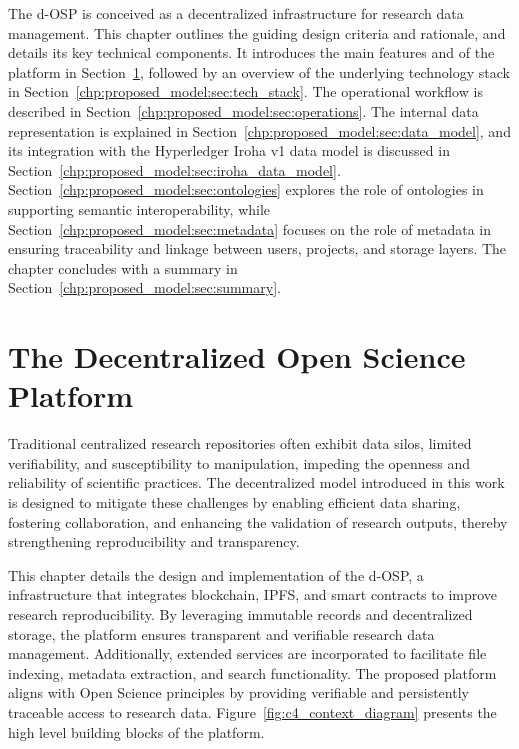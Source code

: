 \documentclass[final]{rc-book-2.14}
\begin{document}
\drop The d-OSP is conceived as a decentralized infrastructure for research data management. This chapter outlines the guiding design criteria and rationale, and details its key technical components. It introduces the main features and of the platform in Section~\ref{chp:proposed_model:sec:osp}, followed by an overview of the underlying technology stack in Section~\ref{chp:proposed_model:sec:tech_stack}. The operational workflow is described in Section~\ref{chp:proposed_model:sec:operations}. The internal data representation is explained in Section~\ref{chp:proposed_model:sec:data_model}, and its integration with the Hyperledger Iroha v1 data model is discussed in Section~\ref{chp:proposed_model:sec:iroha_data_model}. Section~\ref{chp:proposed_model:sec:ontologies} explores the role of ontologies in supporting semantic interoperability, while Section~\ref{chp:proposed_model:sec:metadata} focuses on the role of metadata in ensuring traceability and linkage between users, projects, and storage layers. The chapter concludes with a summary in Section~\ref{chp:proposed_model:sec:summary}.

\newpage

\section{The Decentralized Open Science Platform}
\label{chp:proposed_model:sec:osp}

Traditional centralized research repositories often exhibit data silos, limited verifiability, and susceptibility to manipulation, impeding the openness and reliability of scientific practices. The decentralized model introduced in this work is designed to mitigate these challenges by enabling efficient data sharing, fostering collaboration, and enhancing the validation of research outputs, thereby strengthening reproducibility and transparency.

This chapter details the design and implementation of the d-OSP, a infrastructure that integrates blockchain, IPFS, and smart contracts to improve research reproducibility. By leveraging immutable records and decentralized storage, the platform ensures transparent and verifiable research data management. Additionally, extended services are incorporated to facilitate file indexing, metadata extraction, and search functionality. The proposed platform aligns with Open Science principles by providing verifiable and persistently traceable access to research data. Figure~\ref{fig:c4_context_diagram} presents the high level building blocks of the platform.
\end{document}
